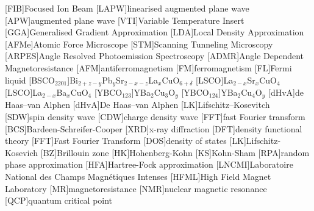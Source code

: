 
[FIB]{Focused Ion Beam}
[LAPW]{linearised augmented plane wave}
[APW]{augmented plane wave}
[VTI]{Variable Temperature Insert}
[GGA]{Generalised Gradient Approximation}
[LDA]{Local Density Approximation}
[AFMe]{Atomic Force Microscope}
[STM]{Scanning Tunneling Microscopy}
[ARPES]{Angle Resolved Photoemission Spectroscopy}
[ADMR]{Angle Dependent Magnetoresistance}
[AFM]{antiferromagnetism}
[FM]{ferromagnetism}
[FL]{Fermi liquid}
[BSCO$_{2201}$]{Bi$_{2+z-y}$Pb$_{y}$Sr$_{2-x-z}$La$_{x}$CuO$_{6+\delta}$}
[LSCO]{La$_{2-x}$Sr$_x$CuO$_4$}
[LSCO]{La$_{2-x}$Ba$_x$CuO$_4$}
[YBCO$_{123}$]{YBa$_2$Cu$_3$O$_y$}
[YBCO$_{124}$]{YBa$_2$Cu$_4$O$_y$}
[dHvA]{de Haas--van Alphen}
[dHvA]{De Haas--van Alphen}
[LK]{Lifschitz--Kosevitch}
[SDW]{spin density wave}
[CDW]{charge density wave}
[FFT]{fast Fourier transform}
[BCS]{Bardeen-Schreifer-Cooper}
[XRD]{x-ray diffraction}
[DFT]{density functional theory}
[FFT]{Fast Fourier Transform}
[DOS]{density of states}
[LK]{Lifschitz-Kosevich}
[BZ]{Brillouin zone}
[HK]{Hohenberg-Kohn}
[KS]{Kohn-Sham}
[RPA]{random phase approximation}
[HFA]{Hartree-Fock approximation}
[LNCMI]{Laboratoire National des Champs Magn\'{e}tiques Intenses} 
[HFML]{High Field Magnet Laboratory}
[MR]{magnetoresistance}
[NMR]{nuclear magnetic resonance}
[QCP]{quantum critical point}


